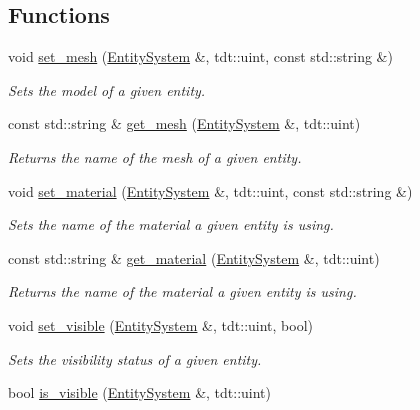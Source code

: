 \subsection*{Functions}
\begin{DoxyCompactItemize}
\item 
void \hyperlink{namespace_graphics_helper_a4fbddfa5e7c494ee6ccd7d802fd58a40}{set\+\_\+mesh} (\hyperlink{class_entity_system}{Entity\+System} \&, tdt\+::uint, const std\+::string \&)
\begin{DoxyCompactList}\small\item\em Sets the model of a given entity. \end{DoxyCompactList}\item 
const std\+::string \& \hyperlink{namespace_graphics_helper_a807ae7c029dbba94bffc3c308607c283}{get\+\_\+mesh} (\hyperlink{class_entity_system}{Entity\+System} \&, tdt\+::uint)
\begin{DoxyCompactList}\small\item\em Returns the name of the mesh of a given entity. \end{DoxyCompactList}\item 
void \hyperlink{namespace_graphics_helper_a478d39aceb704ef6e94fcf1c76224bd3}{set\+\_\+material} (\hyperlink{class_entity_system}{Entity\+System} \&, tdt\+::uint, const std\+::string \&)
\begin{DoxyCompactList}\small\item\em Sets the name of the material a given entity is using. \end{DoxyCompactList}\item 
const std\+::string \& \hyperlink{namespace_graphics_helper_ae15b6b595e343f9d25176f137ee0af44}{get\+\_\+material} (\hyperlink{class_entity_system}{Entity\+System} \&, tdt\+::uint)
\begin{DoxyCompactList}\small\item\em Returns the name of the material a given entity is using. \end{DoxyCompactList}\item 
void \hyperlink{namespace_graphics_helper_a40d7cd5ef3daa2b1ea789da5345eeb3a}{set\+\_\+visible} (\hyperlink{class_entity_system}{Entity\+System} \&, tdt\+::uint, bool)
\begin{DoxyCompactList}\small\item\em Sets the visibility status of a given entity. \end{DoxyCompactList}\item 
bool \hyperlink{namespace_graphics_helper_a31a2646e6b99593eea412f54a78609d5}{is\+\_\+visible} (\hyperlink{class_entity_system}{Entity\+System} \&, tdt\+::uint)

\end{DoxyCompactItemize}
